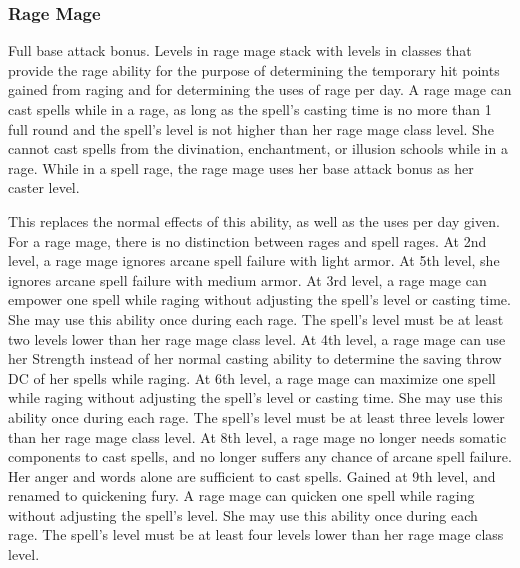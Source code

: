 \subsubsection{Rage Mage}
 Full base attack bonus.
 Levels in rage mage stack with levels in classes that provide the rage ability for the purpose of determining the temporary hit points gained from raging and for determining the uses of rage per day.
 A rage mage can cast spells while in a rage, as long as the spell's casting time is no more than 1 full round and the spell's level is not higher than her rage mage class level. She cannot cast spells from the divination, enchantment, or illusion schools while in a rage. While in a spell rage, the rage mage uses her base attack bonus as her caster level.
\par This replaces the normal effects of this ability, as well as the uses per day given. For a rage mage, there is no distinction between rages and spell rages.
 At 2nd level, a rage mage ignores arcane spell failure with light armor. At 5th level, she ignores arcane spell failure with medium armor.
 At 3rd level, a rage mage can empower one spell while raging without adjusting the spell's level or casting time. She may use this ability once during each rage. The spell's level must be at least two levels lower than her rage mage class level.
 At 4th level, a rage mage can use her Strength instead of her normal casting ability to determine the saving throw DC of her spells while raging.
 At 6th level, a rage mage can maximize one spell while raging without adjusting the spell's level or casting time. She may use this ability once during each rage. The spell's level must be at least three levels lower than her rage mage class level.
 At 8th level, a rage mage no longer needs somatic components to cast spells, and no longer suffers any chance of arcane spell failure. Her anger and words alone are sufficient to cast spells.
 Gained at 9th level, and renamed to quickening fury. A rage mage can quicken one spell while raging without adjusting the spell's level. She may use this ability once during each rage. The spell's level must be at least four levels lower than her rage mage class level.

